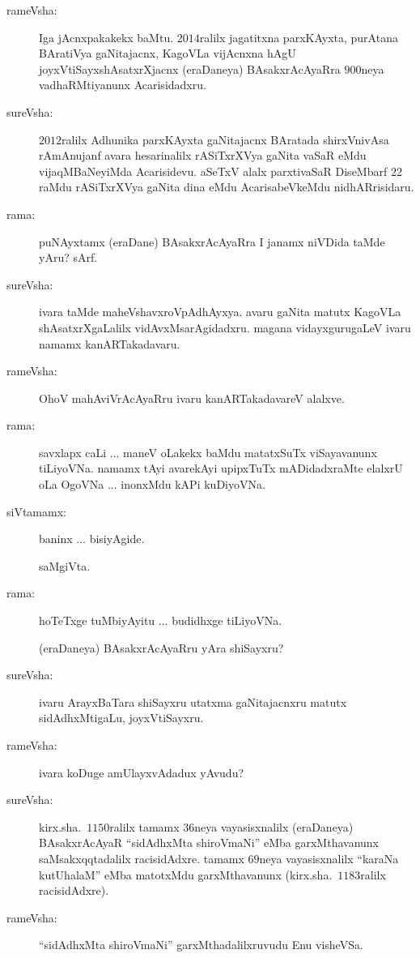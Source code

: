 \begin{description}
\item[rameVsha:] Iga jAcnxpakakekx baMtu. $2014$ralilx jagatitxna parxKAyxta, purAtana BAratiVya gaNitajacnx, KagoVLa vijAcnxna hAgU joyxVtiSayxshAsatxrXjacnx (eraDaneya) BAsakxrAcAyaRra $900$neya vadhaRMtiyanunx Acarisidadxru.

\item[sureVsha:] $2012$ralilx Adhunika parxKAyxta gaNitajacnx BAratada shirxVnivAsa rAmAnujanf avara hesarinalilx rASiTxrXVya gaNita vaSaR eMdu vijaqMBaNeyiMda Acarisidevu. aSeTxV alalx parxtivaSaR DiseMbarf $22$raMdu rASiTxrXVya gaNita dina eMdu AcarisabeVkeMdu nidhARrisidaru.

\item[rama:] puNAyxtamx (eraDane) BAsakxrAcAyaRra I janamx niVDida taMde yAru? sArf.

\item[sureVsha:] ivara taMde maheVshavxroVpAdhAyxya. avaru gaNita matutx KagoVLa shAsatxrXgaLalilx vidAvxMsarAgidadxru. magana vidayxgurugaLeV ivaru namamx kanARTakadavaru.

\item[rameVsha:] OhoV mahAviVrAcAyaRru ivaru kanARTakadavareV alalxve.

\item[rama:] savxlapx caLi ... maneV oLakekx baMdu matatxSuTx viSayavanunx tiLiyoVNa. namamx tAyi avarekAyi upipxTuTx mADidadxraMte elalxrU oLa OgoVNa ... inonxMdu kAPi kuDiyoVNa.

\item[siVtamamx:] baninx ... bisiyAgide.

saMgiVta.

\item[rama:] hoTeTxge tuMbiyAyitu ... budidhxge tiLiyoVNa.

(eraDaneya) BAsakxrAcAyaRru yAra shiSayxru?

\item[sureVsha:] ivaru ArayxBaTara shiSayxru utatxma gaNitajacnxru matutx sidAdhxMtigaLu, joyxVtiSayxru.

\item[rameVsha:] ivara koDuge amUlayxvAdadux yAvudu?

\item[sureVsha:] kirx.sha.\ $1150$ralilx tamamx $36$neya vayasisxnalilx (eraDaneya) BAsakxrAcAyaR ``sidAdhxMta shiroVmaNi'' eMba garxMthavanunx saMsakxqqtadalilx racisidAdxre. tamamx $69$neya vayasisxnalilx ``karaNa kutUhalaM'' eMba matotxMdu garxMthavanunx (kirx.sha.\ $1183$ralilx racisidAdxre).

\item[rameVsha:] ``sidAdhxMta shiroVmaNi'' garxMthadalilxruvudu Enu visheVSa.


\end{description}
